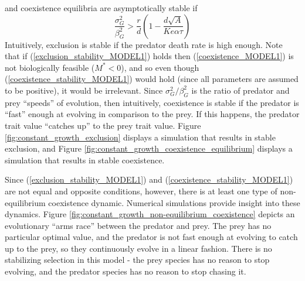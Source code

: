 \documentclass{amsart}
\theoremstyle{definition}
\theoremstyle{remark}
\numberwithin{equation}{section}
\begin{document}
and coexistence equilibria are asymptotically stable if
\begin{equation}
	\label{coexistence_stability_MODEL1}
	\frac{\sigma_G^2}{\beta_G^2} > \frac{r}{d}\left(1 - \frac{d\sqrt{A}}{Ke\alpha\tau}\right)
\end{equation}
Intuitively, exclusion is stable if the predator death rate is high enough.  Note that if (\ref{exclusion_stability_MODEL1}) holds then (\ref{coexistence_MODEL1}) is not biologically feasible ($M^* < 0$), and so even though (\ref{coexistence_stability_MODEL1}) would hold (since all parameters are assumed to be positive), it would be irrelevant.  Since $\sigma_G^2/\beta_G^2$ is the ratio of predator and prey ``speeds'' of evolution, then intuitively, coexistence is stable if the predator is ``fast'' enough at evolving in comparison to the prey.  If this happens, the predator trait value ``catches up'' to the prey trait value.  Figure \ref{fig:constant_growth_exclusion} displays a simulation that results in stable exclusion, and Figure \ref{fig:constant_growth_coexistence_equilibrium} displays a simulation that results in stable coexistence.

Since (\ref{exclusion_stability_MODEL1}) and (\ref{coexistence_stability_MODEL1}) are not equal and opposite conditions, however, there is at least one type of non-equilibrium coexistence dynamic.  Numerical simulations provide insight into these dynamics.  Figure \ref{fig:constant_growth_non-equilibrium_coexistence} depicts an evolutionary ``arms race'' between the predator and prey.  The prey has no particular optimal value, and the predator is not fast enough at evolving to catch up to the prey, so they continuously evolve in a linear fashion.  There is no stabilizing selection in this model - the prey species has no reason to stop evolving, and the predator species has no reason to stop chasing it.
\end{document}
